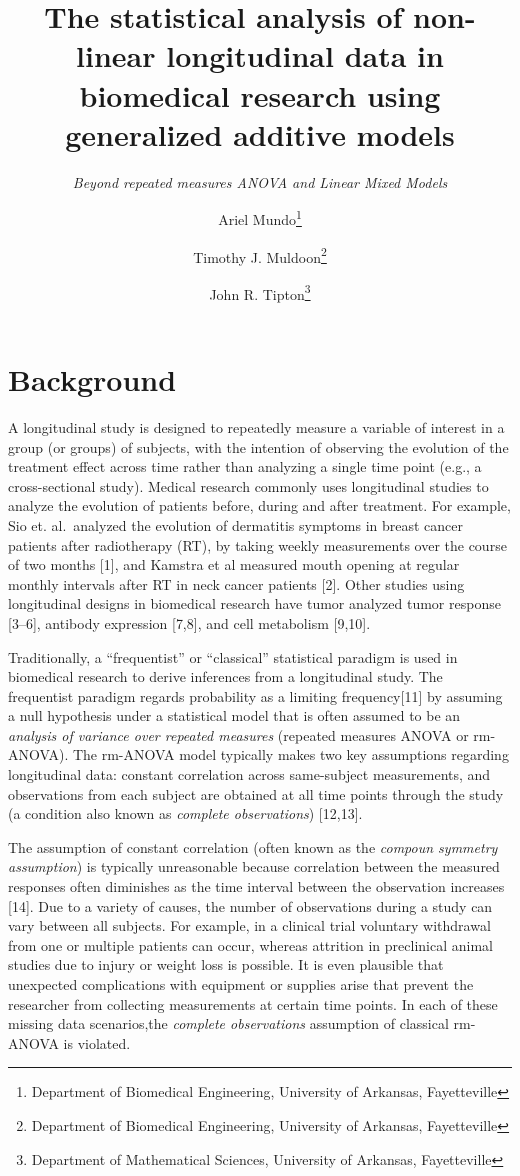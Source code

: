 \documentclass[
]{article}
\title{\textbf{The statistical analysis of non-linear longitudinal data in biomedical research using generalized additive models}}
\subtitle{\emph{Beyond repeated measures ANOVA and Linear Mixed Models}}
\author{Ariel Mundo\footnote{Department of Biomedical Engineering, University of Arkansas, Fayetteville} \and Timothy J. Muldoon\footnote{Department of Biomedical Engineering, University of Arkansas, Fayetteville} \and John R. Tipton\footnote{Department of Mathematical Sciences, University of Arkansas, Fayetteville}}
\date{}
\begin{document}
\maketitle

{
\setcounter{tocdepth}{2}
\tableofcontents
}
\hypertarget{background}{%
\section{Background}\label{background}}

A longitudinal study is designed to repeatedly measure a variable of interest in a group (or groups) of subjects, with the intention of observing the evolution of the treatment effect across time rather than analyzing a single time point (e.g., a cross-sectional study). Medical research commonly uses longitudinal studies to analyze the evolution of patients before, during and after treatment. For example, Sio et. al.~analyzed the evolution of dermatitis symptoms in breast cancer patients after radiotherapy (RT), by taking weekly measurements over the course of two months {[}1{]}, and Kamstra et al measured mouth opening at regular monthly intervals after RT in neck cancer patients {[}2{]}. Other studies using longitudinal designs in biomedical research have tumor analyzed tumor response {[}3--6{]}, antibody expression {[}7,8{]}, and cell metabolism {[}9,10{]}.

Traditionally, a ``frequentist'' or ``classical'' statistical paradigm is used in biomedical research to derive inferences from a longitudinal study. The frequentist paradigm regards probability as a limiting frequency{[}11{]} by assuming a null hypothesis under a statistical model that is often assumed to be an \emph{analysis of variance over repeated measures} (repeated measures ANOVA or rm-ANOVA). The rm-ANOVA model typically makes two key assumptions regarding longitudinal data: constant correlation across same-subject measurements, and observations from each subject are obtained at all time points through the study (a condition also known as \emph{complete observations}) {[}12,13{]}.

The assumption of constant correlation (often known as the \emph{compoun symmetry assumption}) is typically unreasonable because correlation between the measured responses often diminishes as the time interval between the observation increases {[}14{]}.
Due to a variety of causes, the number of observations during a study can vary between all subjects. For example, in a clinical trial voluntary withdrawal from one or multiple patients can occur, whereas attrition in preclinical animal studies due to injury or weight loss is possible. It is even plausible that unexpected complications with equipment or supplies arise that prevent the researcher from collecting measurements at certain time points. In each of these missing data scenarios,the \emph{complete observations} assumption of classical rm-ANOVA is violated.
\end{document}
